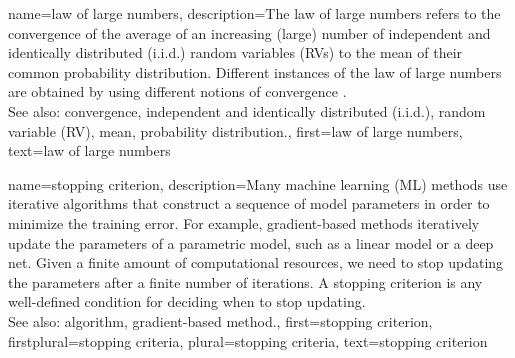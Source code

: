 {
{name={law of large numbers},
	description={The law of large numbers refers to the 
		convergence of the average of an increasing (large) number of independent and identically distributed (i.i.d.) random variables (RVs) 
		to the mean of their common probability distribution. Different instances of the 
		law of large numbers are obtained by using different notions of convergence \cite{papoulis}.
				\\
		See also: convergence, independent and identically distributed (i.i.d.), random variable (RV), mean, probability distribution.},
	first={law of large numbers},
	text={law of large numbers}
}
    
{name={stopping criterion},
	description={Many machine learning (ML) methods use iterative algorithms 
		that construct a sequence of model parameters in order to minimize the training error. 
		For example, gradient-based methods iteratively update the parameters of a parametric model, 
		such as a linear model or a deep net. Given a finite amount of computational 
		resources, we need to stop updating the parameters after a finite number of iterations. 
		A stopping criterion is any well-defined condition for deciding when to stop updating.
				\\
		See also: algorithm, gradient-based method.},
	first={stopping criterion},
	firstplural={stopping criteria},
	plural={stopping criteria}, 
	text={stopping criterion}
}

}
